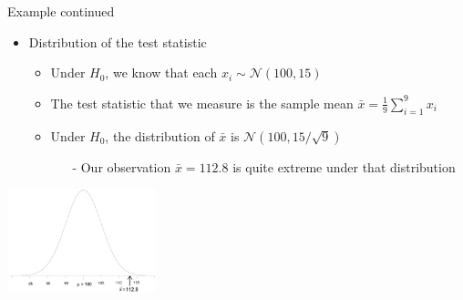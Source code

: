 \begin{frame}[c]{Example continued}

\begin{itemize}

  \item \alert{Distribution of the test statistic} 
  \begin{itemize}
	  \item Under $H_0$, we know that each $x_i \sim \mathcal{N}(100,15)$
	  \smallskip
	  \item The \alert{test statistic} that we measure is the sample
	  mean $\bar{x} = \frac{1}{9} \sum_{i=1}^9 x_i$
	  \bigskip
	  \pause
	  \item Under $H_0$, the distribution of $\bar{x}$ is
	  $\mathcal{N}(100,15/\sqrt{9})$
	  \begin{itemize}
	    \item[-] Our observation $\bar{x}=112.8$ is quite extreme under that
	    distribution
	  \end{itemize}
	\end{itemize}	
\end{itemize}

\begin{center}
\includegraphics[height=3cm]{images/z_test_1.png}
\end{center}

\end{frame}

